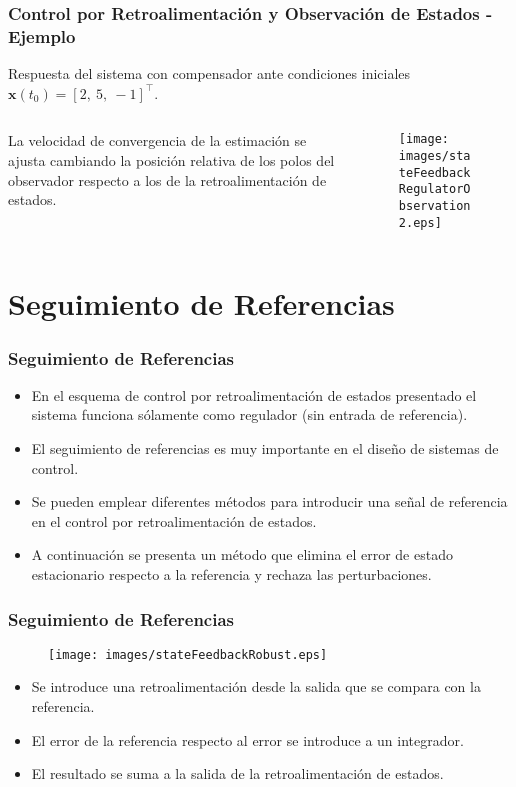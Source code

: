 \documentclass[aspectratio=169,handout]{beamer}
\theoremstyle{definition}
\theoremstyle{plain}
\theoremstyle{remark}
\begin{document}
\begin{frame}[c]\frametitle{Control por Retroalimentación y Observación de Estados - Ejemplo}
	\small
	Respuesta del sistema con compensador ante condiciones iniciales $\mathbf{x}(t_0) = [2,\ 5,\ -1]^\intercal$.
	\vspace{-2mm}
	\begin{columns}
		\begin{column}{0.3\textwidth}
			La velocidad de convergencia de la estimación se ajusta cambiando la posición relativa de los polos del observador respecto a los de la retroalimentación de estados.
		\end{column}
		\begin{column}{0.7\textwidth}
			\begin{figure}
				\centering
				\texttt{[image: images/stateFeedbackRegulatorObservation2.eps]}
			\end{figure}
		\end{column}
	\end{columns}
\end{frame}

\section{Seguimiento de Referencias}
\begin{frame}[<+->]\frametitle{Seguimiento de Referencias}
	\begin{itemize}
		\item En el esquema de control por retroalimentación de estados presentado el sistema funciona sólamente como regulador (sin entrada de referencia).
		\item El seguimiento de referencias es muy importante en el diseño de sistemas de control.
		\item Se pueden emplear diferentes métodos para introducir una señal de referencia en el control por retroalimentación de estados.
		\item A continuación se presenta un método que elimina el error de estado estacionario respecto a la referencia y rechaza las perturbaciones.
	\end{itemize}
\end{frame}

\begin{frame}[c]\frametitle{Seguimiento de Referencias}
	\begin{figure}
		\centering
		\texttt{[image: images/stateFeedbackRobust.eps]}
	\end{figure}
	\begin{itemize}
		\item<2-> Se introduce una retroalimentación desde la salida que se compara con la referencia.
		\item<3-> El error de la referencia respecto al error se introduce a un integrador.
		\item<4-> El resultado se suma a la salida de la retroalimentación de estados.
	\end{itemize}
\end{frame}
\end{document}
